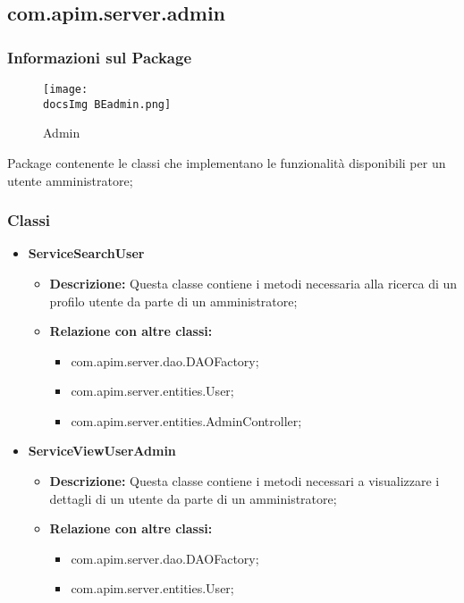 {{     \subsection{com.apim.server.admin}{
    \subsubsection{Informazioni sul Package}
        \begin{figure}[ht]
          \centering
         \texttt{[image: \\docsImg BEadmin.png]}
          \caption{Admin}
          \label{Admin}
        \end{figure}
        Package  contenente le classi che implementano le funzionalità disponibili per un utente amministratore;
        \subsubsection{Classi}
        \begin{itemize} \itemsep1pt
          \item \textbf{ServiceSearchUser}
          \begin{itemize}
            \item \textbf{Descrizione:} Questa classe contiene i metodi necessaria alla ricerca di un profilo utente da parte di un amministratore;
            \item \textbf{Relazione con altre classi:}
            \begin{itemize}
              \item com.apim.server.dao.DAOFactory;
              \item com.apim.server.entities.User;
              \item com.apim.server.entities.AdminController;
            \end{itemize}
          \end{itemize}
          \item \textbf{ServiceViewUserAdmin}
          \begin{itemize}
            \item \textbf{Descrizione:} Questa classe contiene i metodi necessari a visualizzare i dettagli di un utente da parte di un amministratore;
            \item \textbf{Relazione con altre classi:}
            \begin{itemize}
              \item com.apim.server.dao.DAOFactory;
              \item com.apim.server.entities.User;

\end{itemize}
\end{itemize}
\end{itemize}}}}
